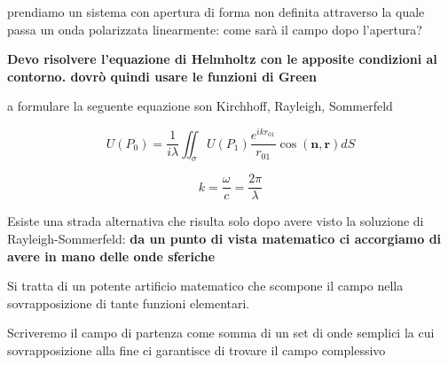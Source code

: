 \documentclass{article}
\begin{document}

prendiamo un sistema con apertura di forma non definita attraverso la quale passa un onda polarizzata linearmente: come sarà il campo dopo l'apertura?

\textbf{Devo risolvere l'equazione di Helmholtz con le apposite condizioni al contorno. dovrò quindi usare le funzioni di Green} 



a formulare la seguente equazione son Kirchhoff, Rayleigh, Sommerfeld

\begin{equation}
U(P_0) = \frac{1}{i\lambda} \iint_\sigma U(P_1) \frac{e^{i k r_{01}}}{r_{01}} \cos(\textbf{n}, \textbf{r}) dS
\end{equation}

\begin{equation}
k = \frac{\omega}{c}  = \frac{2\pi}{\lambda}
\end{equation}

Esiste una strada alternativa che risulta solo dopo avere visto la soluzione di Rayleigh-Sommerfeld: \textbf{da un punto di vista matematico ci accorgiamo di avere in mano delle onde sferiche}

Si tratta di un potente artificio matematico che scompone il campo nella sovrapposizione di tante funzioni elementari.

Scriveremo il campo di partenza come somma di un set di onde semplici la cui sovrapposizione alla fine ci garantisce di trovare il campo complessivo
\end{document}
